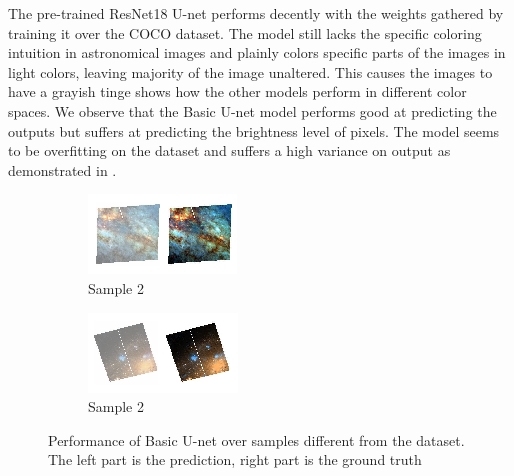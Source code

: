 \documentclass[10pt,twocolumn,letterpaper]{article}
\begin{document}
    \hspace*{0.167 in}The pre-trained ResNet18 U-net performs decently with the weights gathered by training it over the COCO dataset. The model still lacks the specific coloring intuition in astronomical images and plainly colors specific parts of the images in light colors, leaving majority of the image unaltered. This causes the images to have a 
    grayish tinge
     shows how the other models perform in different color spaces. We observe that the Basic U-net model performs good at predicting the outputs but suffers at predicting the brightness level of pixels. The model seems to be overfitting on the dataset and suffers a high variance on output as demonstrated in .
    \begin{figure}[!htb]
    	\centering
    	\begin{subfigure}[b]{0.2\textwidth}
    		\centering
    		\includegraphics[width=\textwidth]{figures/overfit_1}
    		\caption{Sample 2}
    		\label{fig: overfit1}
    	\end{subfigure}
    		\hspace{0.1 in}
    	\begin{subfigure}[b]{0.2\textwidth}
    		\centering
    		\includegraphics[width=\textwidth]{figures/overfit_2}
    		\caption{Sample 2}
    		\label{fig: overfit2}
    	\end{subfigure}
    	\caption{Performance of Basic U-net over samples different from the dataset. The left part is the prediction, right part is the ground truth}
    	\label{fig: u-net_overfit}
    \end{figure}
    
\end{document}
